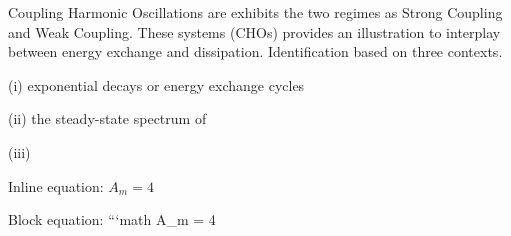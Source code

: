 
Coupling Harmonic Oscillations are exhibits the two regimes as Strong Coupling and Weak Coupling. These systems (CHOs)	provides an illustration to interplay between energy exchange and dissipation. Identification based on three contexts.

(i) exponential decays or energy exchange cycles

(ii) the steady-state spectrum of 

(iii)	

Inline equation: $A_m = 4$

Block equation:
```math
A_m = 4
